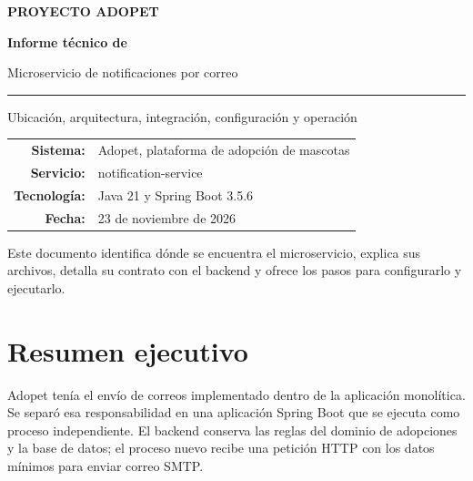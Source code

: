 \documentclass[11pt,a4paper]{article}
\begin{document}
\begin{titlepage}\thispagestyle{empty}\vspace*{22mm}\begin{center}
{\Large\bfseries\color{Teal}PROYECTO ADOPET\par}\vspace{15mm}
{\Huge\bfseries\color{Navy}Informe técnico de\par}\vspace{5mm}
{\LARGE Microservicio de notificaciones por correo\par}\vspace{10mm}\rule{0.72\linewidth}{1.2pt}\par\vspace{8mm}
{\large Ubicación, arquitectura, integración, configuración y operación\par}\vfill
\begin{tabular}{rl}\textbf{Sistema:} & Adopet, plataforma de adopción de mascotas\\\textbf{Servicio:} & notification-service\\\textbf{Tecnología:} & Java 21 y Spring Boot 3.5.6\\\textbf{Fecha:} & 23 de noviembre de 2026\\\end{tabular}\vfill
\begin{minipage}{0.82\linewidth}\centering\small Este documento identifica dónde se encuentra el microservicio, explica sus archivos, detalla su contrato con el backend y ofrece los pasos para configurarlo y ejecutarlo.\end{minipage}\vspace{12mm}\end{center}\end{titlepage}
\tableofcontents\clearpage

\section{Resumen ejecutivo}
Adopet tenía el envío de correos implementado dentro de la aplicación monolítica. Se separó esa responsabilidad en una aplicación Spring Boot que se ejecuta como proceso independiente. El backend conserva las reglas del dominio de adopciones y la base de datos; el proceso nuevo recibe una petición HTTP con los datos mínimos para enviar correo SMTP.
\end{document}
